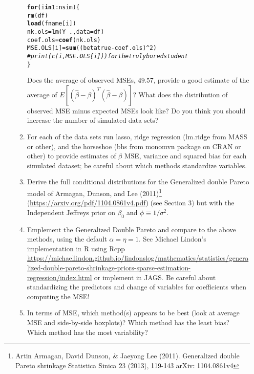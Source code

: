 \documentclass{article}\usepackage[]{graphicx}\usepackage[]{color}
\makeatletter
\newcommand{\hlnum}[1]{\textcolor[rgb]{0.686,0.059,0.569}{#1}}%
\newcommand{\hlcom}[1]{\textcolor[rgb]{0.678,0.584,0.686}{\textit{#1}}}%
\newcommand{\hlopt}[1]{\textcolor[rgb]{0,0,0}{#1}}%
\newcommand{\hlstd}[1]{\textcolor[rgb]{0.345,0.345,0.345}{#1}}%
\newcommand{\hlkwa}[1]{\textcolor[rgb]{0.161,0.373,0.58}{\textbf{#1}}}%
\newcommand{\hlkwb}[1]{\textcolor[rgb]{0.69,0.353,0.396}{#1}}%
\newcommand{\hlkwc}[1]{\textcolor[rgb]{0.333,0.667,0.333}{#1}}%
\newcommand{\hlkwd}[1]{\textcolor[rgb]{0.737,0.353,0.396}{\textbf{#1}}}%
\newenvironment{kframe}{%
 \def\at@end@of@kframe{}%
 \ifinner\ifhmode%
  \def\at@end@of@kframe{\end{minipage}}%
  \begin{minipage}{\columnwidth}%
 \fi\fi%
 \def\FrameCommand##1{\hskip\@totalleftmargin \hskip-\fboxsep
 \colorbox{shadecolor}{##1}\hskip-\fboxsep
     \hskip-\linewidth \hskip-\@totalleftmargin \hskip\columnwidth}%
 \MakeFramed {\advance\hsize-\width
   \@totalleftmargin\z@ \linewidth\hsize
   \@setminipage}}%
 {\par\unskip\endMakeFramed%
 \at@end@of@kframe}
\newenvironment{knitrout}{}{} %
\makeatother
\begin{document}
\begin{enumerate}
\begin{enumerate}
\begin{knitrout}
\begin{kframe}
\begin{alltt}
\hlkwa{for}\hlstd{( i} \hlkwa{in} \hlnum{1}\hlopt{:}\hlstd{nsim) \{}
  \hlkwd{rm}\hlstd{(df)}
  \hlkwd{load}\hlstd{(fname[i])}
  \hlstd{nk.ols} \hlkwb{=} \hlkwd{lm}\hlstd{(Y} \hlopt{~} \hlstd{.,} \hlkwc{data}\hlstd{=df)}
  \hlstd{coef.ols} \hlkwb{=} \hlkwd{coef}\hlstd{(nk.ols)}
  \hlstd{MSE.OLS[i]} \hlkwb{=} \hlkwd{sum}\hlstd{((betatrue} \hlopt{-} \hlstd{coef.ols)}\hlopt{^}\hlnum{2}\hlstd{)}
\hlcom{#  print(c(i, MSE.OLS[i]))  for the truly bored student}
\hlstd{\}}
\end{alltt}
\end{kframe}
\end{knitrout}

Does  the average of observed MSEs, 49.57, provide a good estimate  of the average of $E[(\hat{\beta} - \beta)^T(\hat{\beta} - \beta)]$? What does the distribution of observed MSE minus expected MSEs look like?   Do you think you should increase the number of simulated data sets?

\item For each of the data sets run lasso, ridge regression (lm.ridge from MASS or other), and the horseshoe (bhs from monomvn package on CRAN or other) to provide estimates of $\beta$  MSE, variance and squared bias for each simulated dataset; be careful about which methods standardize variables.







\item Derive the full conditional distributions for the Generalized double Pareto model of Armagan, Dunson, and Lee (2011)\footnote{Artin Armagan, David Dunson, \& Jaeyong Lee (2011). Generalized double Pareto shrinkage Statistica Sinica 23 (2013), 119-143 arXiv: 1104.0861v4 } (\url{https://arxiv.org/pdf/1104.0861v4.pdf})
(see Section 3) but with the Independent Jeffreys prior on $\beta_0$ and $\phi \equiv 1/\sigma^2$.

\item  Emplement the Generalized Double Pareto  and compare to the above methods, using the default $\alpha = \eta = 1$.
See
    Michael Lindon's implementation in R using Rcpp \url{https://michaellindon.github.io/lindonslog/mathematics/statistics/generalized-double-pareto-shrinkage-priors-sparse-estimation-regression/index.html}  or implement in JAGS.  Be careful about standardizing the predictors and change of variables for coefficients when computing the MSE!

\item In terms of MSE, which method(s) appears to be best (look  at average MSE and side-by-side boxplots)?  Which method has the least bias?  Which method has the most variability?


\end{enumerate}
\end{enumerate}
\end{document}
